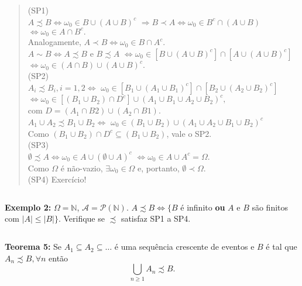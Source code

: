 \documentclass[
]{book}
\begin{document}
\begin{quote}
(SP1)\\
\(A \precsim B \Leftrightarrow \omega_0 \in B \cup (A \cup B)^c\)
\(\Rightarrow B \prec A \Leftrightarrow \omega_0 \in B^c \cap (A \cup B)\)
\(\Leftrightarrow \omega_0 \in A \cap B^c.\)\\
Analogamente, \(A \prec B \Leftrightarrow \omega_0 \in B \cap A^c.\)\\
\(A \sim B \Leftrightarrow A \precsim B\) e \(B \precsim A\)
\(\Leftrightarrow \omega_0 \in [B \cup (A \cup B)^c] \cap [A \cup (A \cup B)^c]\)
\(\Leftrightarrow \omega_0 \in (A \cap B) \cup (A \cup B)^c.\)\\
\(~\)\\
(SP2)\\
\(A_i \precsim B_i , i=1,2 \Leftrightarrow\) \(\omega_0 \in [B_1 \cup (A_1 \cup B_1)^c] \cap [B_2 \cup (A_2 \cup B_2)^c]\) \(\Leftrightarrow \omega_0 \in [(B_1 \cup B_2) \cap D^c] \cup (A_1 \cup B_1 \cup A_2 \cup B_2)^c,\)\\
com \(D = (A_1 \cap B2) \cup (A_2 \cap B1).\)\\
\(A_1 \cup A_2 \precsim B_1 \cup B_2 \Leftrightarrow\) \(\omega_0 \in (B_1 \cup B_2) \cup (A_1 \cup A_2 \cup B_1 \cup B_2)^c\)\\
Como \((B_1 \cup B_2) \cap D^c \subseteq (B_1 \cup B_2)\), vale o SP2.\\
\(~\)\\
(SP3)\\
\(\emptyset \precsim A \Leftrightarrow \omega_0 \in A \cup (\emptyset \cup A)^c\) \(\Leftrightarrow \omega_0 \in A \cup A^c = \Omega.\)\\
Como \(\Omega\) é não-vazio, \(\exists \omega_0 \in \Omega\) e, portanto, \(\emptyset \prec \Omega\).\\
\(~\)\\
(SP4) Exercício!
\end{quote}

\(~\)

\textbf{Exemplo 2:} \(\Omega = \mathbb{N}\), \(\mathcal{A} = \mathcal{P}(\mathbb{N})\). \(A \precsim B \Leftrightarrow \{B\) é infinito \textbf{ou} \(A\) e \(B\) são finitos com \(|A| \leq |B|\}\). Verifique se \(\precsim\) satisfaz SP1 a SP4.

\(~\)

\textbf{Teorema 5:} Se \(A_1 \subseteq A_2 \subseteq \ldots\) é uma sequência crescente de eventos e \(B\) é tal que \(A_n \precsim B, \forall n\) então \[\bigcup_{n \geq 1} A_n \precsim B.\]
\end{document}
